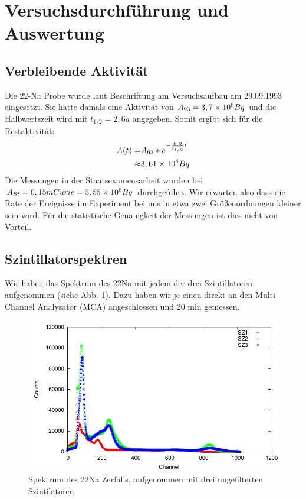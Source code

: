 \section{Versuchsdurchführung und Auswertung}

\subsection{Verbleibende Aktivität}

Die 22-Na Probe wurde laut Beschriftung am Versuchsaufbau am 29.09.1993 eingesetzt. Sie hatte damals eine Aktivität von $A_{93} = 3,7\times 10^{6} Bq$ und die Halbwertszeit wird mit $t_{1/2} = 2,6 a$ angegeben. Somit ergibt sich für die Restaktivität:
\begin{eqnarray*}
 A(t) = & A_{93} * e^{-\frac{\ln 2}{t_{1/2}} t} \\
      \approx & 3,61\times 10^{4} Bq
\end{eqnarray*}
Die Messungen in der Staatsexamensarbeit wurden bei $A_{St} = 0,15 mCurie = 5,55\times 10^{6} Bq$ durchgeführt. Wir erwarten also dass die Rate der Ereignisse im Experiment bei uns in etwa zwei Größenordnungen kleiner sein wird. Für die statistische Genauigkeit der Messungen ist dies nicht von Vorteil.

\subsection{Szintillatorspektren}
Wir haben das Spektrum des 22Na mit jedem der drei Szintillatoren aufgenommen (siehe Abb. \ref{22na-schrottspektrum}). Dazu haben wir je einen direkt an den Multi Channel Analysator (MCA) angeschlossen und 20 min gemessen.

\begin{figure}
 \includegraphics[width=\textwidth]{Graphen/Na-Spektren/na-spektren-1.pdf}
 \caption{Spektrum des 22Na Zerfalls, aufgenommen mit drei ungefilterten Szintilatoren}
 \label{22na-schrottspektrum}
\end{figure}

